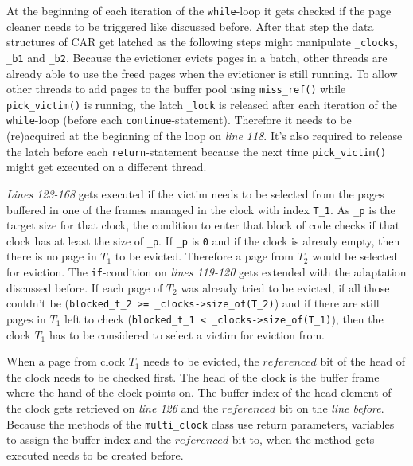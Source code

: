 	At the beginning of each iteration of the \lstinline{while}-loop it gets checked if the page cleaner needs to be triggered like discussed before. After that step the data structures of CAR get latched as the following steps might manipulate \lstinline{_clocks}, \lstinline{_b1} and \lstinline{_b2}. Because the evictioner evicts pages in a batch, other threads are already able to use the freed pages when the evictioner is still running. To allow other threads to add pages to the buffer pool using \lstinline{miss_ref()} while \lstinline{pick_victim()} is running, the latch \lstinline{_lock} is released after each iteration of the \lstinline{while}-loop (before each \lstinline{continue}-statement). Therefore it needs to be (re)acquired at the beginning of the loop on \emph{line 118}. It's also required to release the latch before each \lstinline{return}-statement because the next time \lstinline{pick_victim()} might get executed on a different thread.
	
	\emph{Lines 123-168} gets executed if the victim needs to be selected from the pages buffered in one of the frames managed in the clock with index \lstinline{T_1}. As \lstinline{_p} is the target size for that clock, the condition to enter that block of code checks if that clock has at least the size of \lstinline{_p}. If \lstinline{_p} is \lstinline{0} and if the clock is already empty, then there is no page in $T_1$ to be evicted. Therefore a page from $T_2$ would be selected for eviction. The \lstinline{if}-condition on \emph{lines 119-120} gets extended with the adaptation discussed before. If each page of $T_2$ was already tried to be evicted, if all those couldn't be (\lstinline{blocked_t_2 >= _clocks->size_of(T_2)}) and if there are still pages in $T_1$ left to check (\lstinline{blocked_t_1 < _clocks->size_of(T_1)}), then the clock $T_1$ has to be considered to select a victim for eviction from.
	
	When a page from clock $T_1$ needs to be evicted, the $referenced$ bit of the head of the clock needs to be checked first. The head of the clock is the buffer frame where the hand of the clock points on. The buffer index of the head element of the clock gets retrieved on \emph{line 126} and the $referenced$ bit on the \emph{line before}. Because the methods of the \lstinline{multi_clock} class use return parameters, variables to assign the buffer index and the $referenced$ bit to, when the method gets executed needs to be created before. 
	
